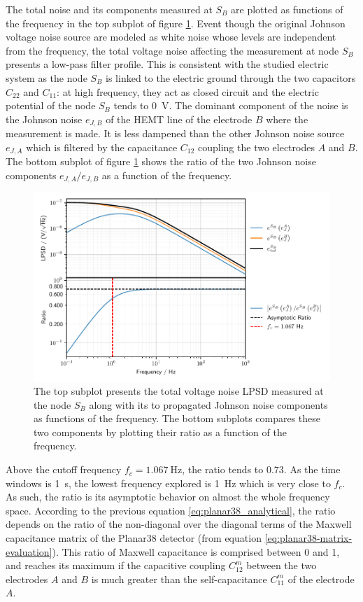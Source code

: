 The total noise and its components measured at $S_B$ are plotted as functions of the frequency in the top subplot of figure \ref{fig:planar38-analytical-results}. Event though the original Johnson voltage noise source are modeled as white noise whose levels are independent from the frequency, the total voltage noise affecting the measurement at node $S_B$ presents a low-pass filter profile. This is consistent with the studied electric system as the node $S_B$ is linked to the electric ground through the two capacitors $C_{22}$ and $C_{11}$: at high frequency, they act as closed circuit and the electric potential of the node $S_B$ tends to \SI{0}{\volt}. The dominant component of the noise is the Johnson noise $e_{J,B}$ of the HEMT line of the electrode $B$ where the measurement is made. It is less dampened than the other Johnson noise source $e_{J,A}$ which is filtered by the capacitance $C_{12}$ coupling the two electrodes $A$ and $B$. The bottom subplot of figure \ref{fig:planar38-analytical-results} shows the ratio of the two Johnson noise components $e_{J,A}/e_{J,B}$ as a function of the frequency.

\begin{figure}
\centering
\includegraphics[scale=1]{Figures/Electrodes/pl38_analytical_noise_propagation.pdf}
\caption{The top subplot presents the total voltage noise LPSD measured at the node $S_B$ along with its to propagated Johnson noise components as functions of the frequency. The bottom subplots compares these two components by plotting their ratio as a function of the frequency.
}
\label{fig:planar38-analytical-results}
\end{figure}

Above the cutoff frequency $f_c = \SI{1.067}{\Hz}$, the ratio tends to $0.73$. As the time windows is \SI{1}{\s}, the lowest frequency explored is \SI{1}{\Hz} which is very close to $f_c$. As such, the ratio is its asymptotic behavior on almost the whole frequency space. According to the previous equation \ref{eq:planar38_analytical}, the ratio depends on the ratio of the non-diagonal over the diagonal terms of the Maxwell capacitance matrix of the Planar38 detector (from equation \ref{eq:planar38-matrix-evaluation}). This ratio of Maxwell capacitance is comprised between 0 and 1, and reaches its maximum if the capacitive coupling $C_{12}^m$ between the two electrodes $A$ and $B$ is much greater than the self-capacitance $C_{11}^m$ of the electrode $A$.

